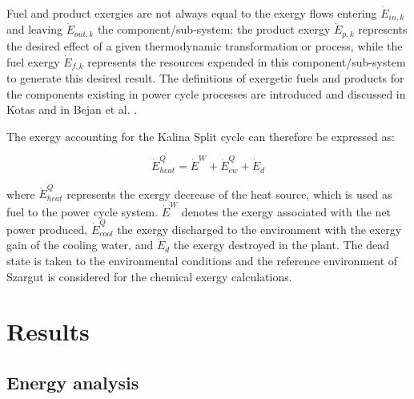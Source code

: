 \documentclass[final,times,3p]{elsarticle}
\begin{document}
\begin{itemize}
	Fuel and product exergies are not always equal to the exergy flows entering $\dot{E}_{in,k}$ and leaving $\dot{E}_{out,k}$ the component/sub-system: the product exergy $\dot{E}_{p,k}$ represents the desired effect of a given thermodynamic transformation or process, while the fuel exergy $\dot{E}_{f,k}$ represents the resources expended in this component/sub-system to generate this desired result. The definitions of exergetic fuels and products for the components existing in power cycle processes are introduced and discussed in Kotas \cite{Kotas1980,Kotas1980a,Kotas1995} and in Bejan et al. \cite{BejanAdrian;TsatsaronisGeorge;Moran1996}. 

	\end{itemize}
	

	The exergy accounting for the Kalina Split cycle can therefore be expressed as:

	\begin{equation}
		\dot{E}^{Q}_{heat}=\dot{E}^{W}+\dot{E}^{Q}_{cw}+\dot{E}_{d}
	\end{equation}

	where $\dot{E}^{Q}_{heat}$ represents the exergy decrease of the heat source, which is used as fuel to the power cycle system. $\dot{E}^{W}$ denotes the exergy associated with the net power produced, $\dot{E}^{Q}_{cool}$ the exergy discharged to the environment with the exergy gain of the cooling water, and $\dot{E}_{d}$ the exergy destroyed in the plant. The dead state is taken to the environmental conditions and the reference environment of Szargut \cite{Szargut1998} is considered for the chemical exergy calculations.
	

		

\section{Results}
\label{sec:results}

\subsection{Energy analysis}
\end{document}

